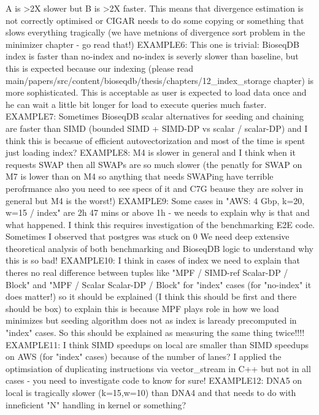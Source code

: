 A is >2X slower but B is >2X faster. This means that divergence estimation is not correctly optimised or CIGAR needs to do some copying or something that slows everything tragically (we have metnions of divergence sort problem in the minimizer chapter - go read that!)
EXAMPLE6:
This one is trivial: BioseqDB index is faster than no-index and no-index is severly slower than baseline, but this is expected because our indexing (please read main/papers/src/content/bioseqdb/thesis/chapters/12_index_storage chapter) is more sophisticated. This is acceptable as user is expected to load data once and he can wait a little bit longer for load to execute queries much faster.
EXAMPLE7:
Sometimes BioseqDB scalar alternatives for seeding and chaining are faster than SIMD (bounded SIMD + SIMD-DP vs scalar / scalar-DP) and I think this is becasue of efficient autovectorization and most of the time is spent just loading index?
EXAMPLE8:
M4 is slower in general and I think when it requests SWAP then all SWAPs are so much slower (the penatly for SWAP on M7 is lower than on M4 so anything that needs SWAPing have terrible perofrmance also you need to see specs of it and C7G beause they are solver in general but M4 is the worst!)
EXAMPLE9:
Some cases in "AWS: 4 Gbp, k=20, w=15 / index" are 2h 47 mins or above 1h - we needs to explain why is that and what happened. I think this requires investigation of the benchmarking E2E code.
Sometimes I observed that postgres was stuck on 0%
We need deep extensive theoretical analysis of both benchmarking and BioseqDB logic to understand why this is so bad!
EXAMPLE10:
I think in cases of index we need to explain that theres no real difference between tuples like "MPF / SIMD-ref Scalar-DP / Block" and "MPF / Scalar Scalar-DP / Block" for "index" cases (for "no-index" it does matter!)
so it should be explained (I think this should be first and there should be \warn box) to explain this is because MPF plays role in how we load minimizes but seeding algorithm does not as index is laready precomputed in "index" cases.
So this should be explained as measuring the same thing twice!!!!
EXAMPLE11:
I think SIMD speedups on local are smaller than SIMD speedups on AWS (for "index" cases) because of the number of lanes? I applied the optimsiation of duplicating instructions via vector_stream in C++
but not in all cases - you need to investigate code to know for sure!
EXAMPLE12:
DNA5 on local is tragically slower (k=15,w=10) than DNA4 and that needs to do with inneficient "N" handling in kernel or something?
